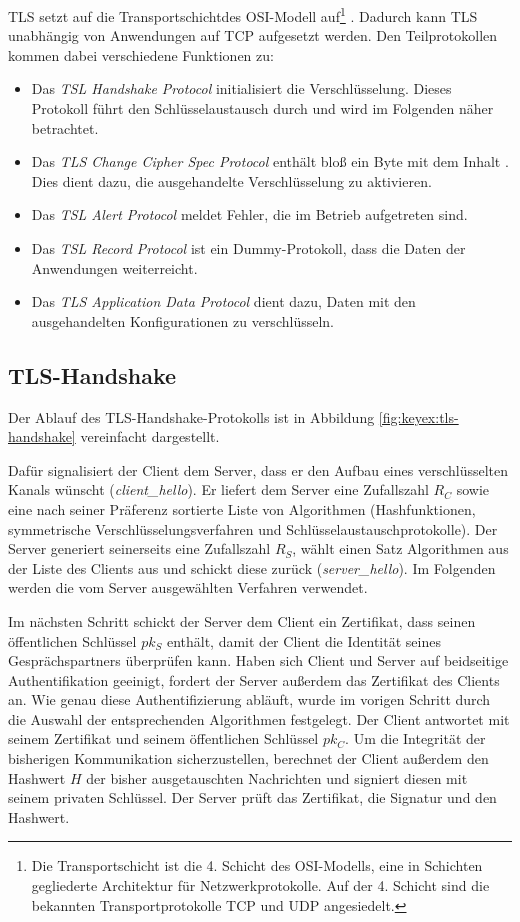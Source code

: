 TLS setzt auf die Transportschicht\indexTransportSchicht des OSI-Modell
auf\footnote{Die 
  Transportschicht ist die 4. Schicht des OSI-Modells, eine in Schichten
  gegliederte Architektur für Netzwerkprotokolle. Auf der 4. Schicht
  sind die bekannten Transportprotokolle TCP und UDP angesiedelt.}
. Dadurch kann TLS unabhängig von Anwendungen auf TCP aufgesetzt
werden. Den Teilprotokollen kommen dabei verschiedene Funktionen zu:
\begin{itemize}
\item Das \emph{TSL Handshake Protocol} initialisiert die
  Verschlüsselung. Dieses Protokoll führt den Schlüsselaustausch durch
  und wird im Folgenden näher betrachtet.
\item Das \emph{TLS Change Cipher Spec Protocol} enthält bloß ein Byte
  mit dem Inhalt \grqq. Dies dient dazu, die ausgehandelte
  Verschlüsselung zu aktivieren.
\item Das \emph{TSL Alert Protocol} meldet Fehler, die im Betrieb
  aufgetreten sind.
\item Das \emph{TSL Record Protocol} ist ein Dummy-Protokoll, dass die
  Daten der Anwendungen weiterreicht.
\item Das \emph{TLS Application Data Protocol} dient dazu, Daten mit den
  ausgehandelten Konfigurationen zu verschlüsseln.
\end{itemize}

\subsection{TLS-Handshake}\indexTLSHandshake 
Der Ablauf des TLS-Handshake-Protokolls ist in Abbildung
\ref{fig:keyex:tls-handshake} vereinfacht dargestellt.

Dafür signalisiert der Client dem Server, dass er den Aufbau eines
verschlüsselten Kanals wünscht (\emph{client\_hello}). Er liefert dem
Server eine Zufallszahl $R_C$ sowie eine nach seiner Präferenz sortierte
Liste von Algorithmen (Hashfunktionen, symmetrische
Verschlüsselungsverfahren und Schlüsselaustauschprotokolle). Der Server
generiert seinerseits eine Zufallszahl $R_S$, wählt einen Satz
Algorithmen aus der Liste des Clients aus und schickt diese zurück
(\emph{server\_hello}). Im Folgenden werden die vom Server ausgewählten
Verfahren verwendet.

Im nächsten Schritt schickt der Server dem Client ein Zertifikat, dass
seinen öffentlichen Schlüssel $pk_S$ enthält, damit der Client
die Identität seines Gesprächspartners überprüfen kann. Haben sich
Client und Server auf beidseitige Authentifikation geeinigt, fordert der
Server außerdem das Zertifikat des Clients an.  Wie genau diese
Authentifizierung abläuft, wurde im vorigen Schritt durch die Auswahl
der entsprechenden Algorithmen festgelegt. Der Client antwortet mit
seinem Zertifikat und seinem öffentlichen Schlüssel $pk_C$. Um die
Integrität der bisherigen Kommunikation sicherzustellen, berechnet der
Client außerdem den Hashwert $H$ der bisher ausgetauschten Nachrichten
und signiert diesen mit seinem privaten Schlüssel. Der Server prüft das
Zertifikat, die Signatur und den Hashwert.

